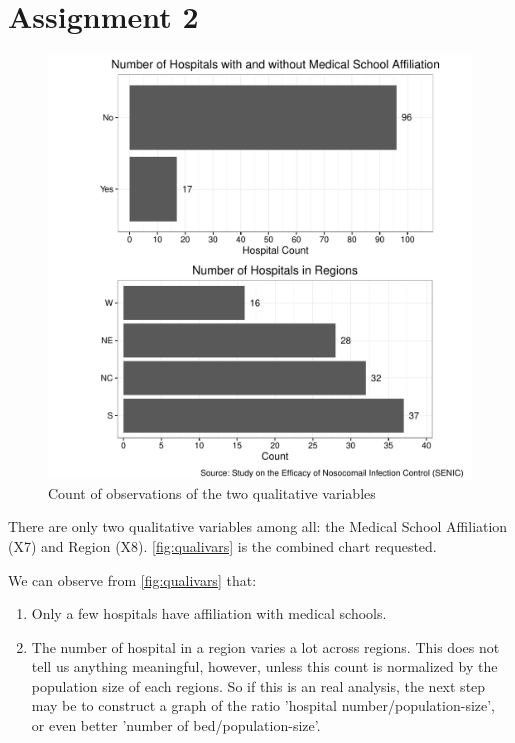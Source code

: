 \documentclass[11pt]{article}
\begin{document}
\section*{Assignment 2}


\begin{figure}[H]
  \centering
  \includegraphics[scale=0.8]{qualitative_vars.pdf}
  \caption{Count of observations of the two
    qualitative variables}
  \label{fig:qualivars}
\end{figure}

There are only two qualitative variables among all: the Medical School
Affiliation (X7) and Region (X8). \autoref{fig:qualivars} is the combined
chart requested.

We can observe from \autoref{fig:qualivars} that:
\begin{enumerate}
\item
  Only a few hospitals have affiliation with medical schools.
\item
  The number of hospital in a region varies a lot across regions. This
  does not tell us anything meaningful, however, unless this count is
  normalized by the population size of each regions. So if this is an
  real analysis, the next step may be to construct a graph of the ratio
  'hospital number/population-size', or even better
  'number of bed/population-size'.
\end{enumerate}
\end{document}
